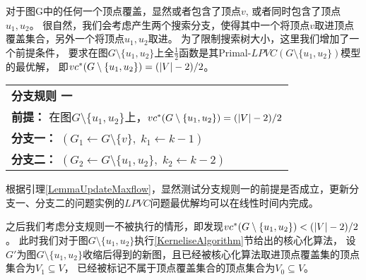 对于图G中的任何一个顶点覆盖，显然或者包含了顶点$v$, 或者同时包含了顶点$u_1, u_2$。
很自然，我们会考虑产生两个搜索分支，使得其中一个将顶点$v$取进顶点覆盖集合，另外一个将顶点$u_1, u_2$取进。
为了限制搜索树大小，这里我们增加了一个前提条件，
要求在图$G \setminus \{u_1, u_2\}$上全$\frac{1}{2}$函数是其Primal-$LPVC(G \setminus \{u_1, u_2\})$模型的最优解，
即$vc^*(G \setminus \{u_1, u_2\}) = (\left\vert V \right\vert - 2) / 2$。\\

\begin{tabular}{ p{0.9\headwidth} }
  \hline
  \textbf{分支规则 一 }\\
  \textbf{前提：}  在图$G \setminus \{u_1, u_2\}$上，$vc^*(G \setminus \{u_1, u_2\}) = (\left\vert V \right\vert - 2) / 2$\\
  \textbf{分支一：} $(G_1 \leftarrow G \setminus \{v\},\; k_1 \leftarrow k - 1)$\\
  \textbf{分支二：} $(G_2 \leftarrow G \setminus \{u_1, u_2\},\; k_2 \leftarrow k - 2)$\\
  \hline
\end{tabular} \vspace{0.5cm}

根据引理\ref{LemmaUpdateMaxflow}，显然测试分支规则一的前提是否成立，更新分支一、分支二的问题实例的$LPVC$问题最优解均可以在线性时间内完成。

之后我们考虑分支规则一不被执行的情形，即发现$vc^*(G \setminus \{u_1, u_2\}) < (\left\vert V \right\vert - 2) / 2$。
此时我们对于图$G \setminus \{u_1, u_2\}$执行\ref{KerneliseAlgorithm}节给出的核心化算法，
设$G'$为图$G\setminus\{u_1, u_2\}$收缩后得到的新图，且已经被核心化算法取进顶点覆盖集的顶点集合为$V_1 \subseteq V$，
已经被标记不属于顶点覆盖集合的顶点集合为$V_0 \subseteq V$。

